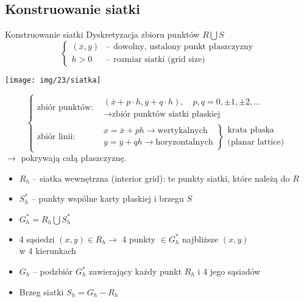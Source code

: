 \subsection{Konstruowanie siatki}

\begin{frame}{Konstruowanie siatki}
  Dyskretyzacja zbioru punktów $R \bigcup S$
  $$ \left\{ \begin{array}{ll}
  (\overline{x}, \overline{y}) & \text{-- dowolny, ustalony punkt płaszczyzny} \\
  h > 0 & \text{-- rozmiar siatki (grid size)}
  \end{array} \right.$$
  \centerline{\texttt{[image: img/23/siatka]}}
\end{frame}

\begin{frame}
  $$ \left\{ \begin{array}{ll}
  \text{zbiór punktów:} & \begin{array}{l} (\overline{x} + p \cdot h, \overline{y} + q \cdot h), \quad p,q = 0, \pm 1, \pm 2, \dots \\
    \rightarrow \text{zbiór punktów siatki płaskiej} \end{array}\\
  \text{zbiór linii:} & \left. \begin{array}{l}
    x = \overline{x} + p h \rightarrow \text{wertykalnych} \\
    y = \overline{y} + q h \rightarrow \text{horyzontalnych}
  \end{array} \right\} \begin{array}{l} \text{krata płaska} \\ \text{(planar lattice)} \end{array}
  \end{array} \right. $$
  $\rightarrow$ pokrywają całą płaszczyznę.
\end{frame}

\begin{frame}
  \begin{block}{}
    \begin{itemize}
      \item $R_h$ -- siatka wewnętrzna (interior grid): te punkty siatki, które należą do $R$
      \item $S_h^*$ -- punkty wspólne karty płaskiej i brzegu $S$
      \item $G_h^* = R_h \bigcup S_h^*$
      \item 4 sąsiedzi $(x,y) \in R_h \rightarrow$ 4 punkty $\in G_h^*$ najbliższe $(x,y)$  \\
w 4 kierunkach
      \item $G_h$ -- podzbiór $G_h^*$ zawierający każdy punkt $R_h$ i 4 jego sąsiadów
      \item Brzeg siatki $S_h = G_h - R_h$
    \end{itemize}
  \end{block}
\end{frame}
